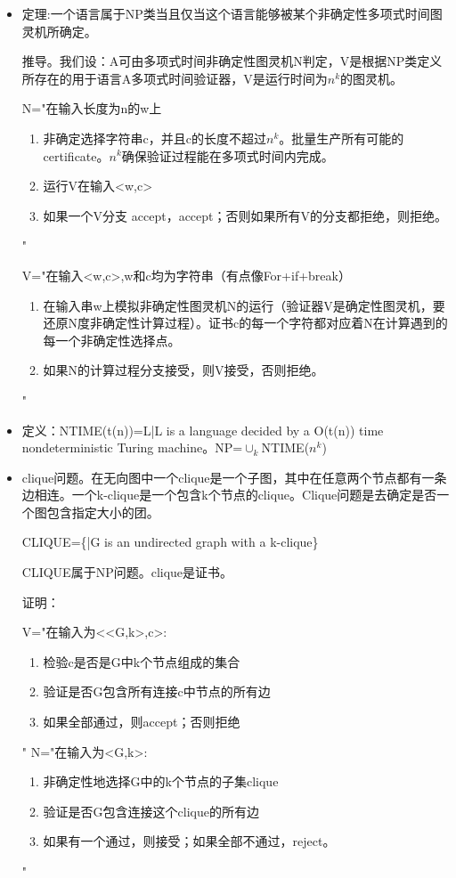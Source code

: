 \documentclass[UTF8]{ctexart}
\begin{document}
\begin{itemize}
    "

    \item 定理:一个语言属于NP类当且仅当这个语言能够被某个非确定性多项式时间图灵机所确定。
    
    推导。我们设：A可由多项式时间非确定性图灵机N判定，V是根据NP类定义所存在的用于语言A多项式时间验证器，V是运行时间为$n^k$的图灵机。

    N="在输入长度为n的w上
    \begin{enumerate}
        \item 非确定选择字符串c，并且c的长度不超过$n^k$。批量生产所有可能的certificate。$n^k$确保验证过程能在多项式时间内完成。
        \item 运行V在输入<w,c>
        \item 如果一个V分支 accept，accept；否则如果所有V的分支都拒绝，则拒绝。
    \end{enumerate}
    "

    V="在输入<w,c>,w和c均为字符串（有点像For+if+break）
    \begin{enumerate}
        \item 在输入串w上模拟非确定性图灵机N的运行（验证器V是确定性图灵机，要还原N度非确定性计算过程）。证书c的每一个字符都对应着N在计算遇到的每一个非确定性选择点。
        \item 如果N的计算过程分支接受，则V接受，否则拒绝。
    \end{enumerate}
    "

    \item 定义：NTIME(t(n))={L|L is a language decided by a O(t(n)) time nondeterministic Turing machine}。NP=$\cup_k$NTIME($n^k$)
    \item clique问题。在无向图中一个clique是一个子图，其中在任意两个节点都有一条边相连。一个k-clique是一个包含k个节点的clique。Clique问题是去确定是否一个图包含指定大小的团。
    
    CLIQUE=\{<G,k>|G is an undirected graph with a k-clique\}
    
    CLIQUE属于NP问题。clique是证书。

    证明：

    V="在输入为<<G,k>,c>:
    \begin{enumerate}
        \item 检验c是否是G中k个节点组成的集合
        \item 验证是否G包含所有连接c中节点的所有边
        \item 如果全部通过，则accept；否则拒绝
    \end{enumerate}
    "
    N="在输入为<G,k>:
    \begin{enumerate}
        \item 非确定性地选择G中的k个节点的子集clique
        \item 验证是否G包含连接这个clique的所有边
        \item 如果有一个通过，则接受；如果全部不通过，reject。
    \end{enumerate}
    "
    

\end{itemize}
\end{document}
